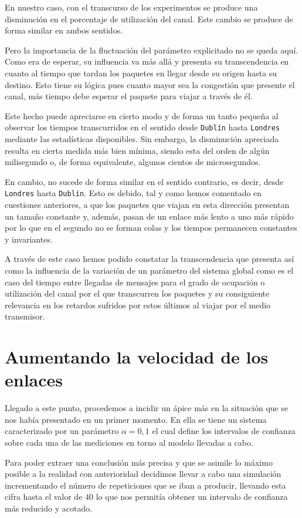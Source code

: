 \documentclass{article}[10pt]
\begin{document}
		En nuestro caso, con el transcurso de los experimentos se produce una disminución en el porcentaje de utilización del canal. Este cambio se produce de forma similar en ambos sentidos.

		Pero la importancia de la fluctuación del parámetro explicitado no se queda aquí. Como era de esperar, su influencia va más allá y presenta su transcendencia en cuanto al tiempo que tardan los paquetes en llegar desde su origen hasta su destino. Esto tiene su lógica pues cuanto mayor sea la congestión que presente el canal, más tiempo debe esperar el paquete para viajar a través de él.

		Este hecho puede apreciarse en cierto modo y de forma un tanto pequeña al observar los tiempos transcurridos en el sentido desde \texttt{Dublín} hasta \texttt{Londres} mediante las estadísticas disponibles. Sin embargo, la disminución apreciada resulta en cierta medida más bien mínima, siendo esta del orden de algún milisegundo o, de forma equivalente, algunos cientos de microsegundos.

		En cambio, no sucede de forma similar en el sentido contrario, es decir, desde \texttt{Londres} hasta \texttt{Dublín}. Esto es debido, tal y como hemos comentado en cuestiones anteriores, a que los paquetes que viajan en esta dirección presentan un tamaño constante y, además, pasan de un enlace más lento a uno más rápido por lo que en el segundo no se forman colas y los tiempos permanecen constantes y invariantes.

		A través de este caso hemos podido constatar la transcendencia que presenta así como la influencia de la variación de un parámetro del sistema global como es el caso del tiempo entre llegadas de mensajes para el grado de ocupación o utilización del canal por el que transcurren los paquetes y su consiguiente relevancia en los retardos sufridos por estos últimos al viajar por el medio transmisor.

	\section{Aumentando la velocidad de los enlaces}
		Llegado a este punto, procedemos a incidir un ápice más en la situación que se nos había presentado en un primer momento. En ella se tiene un sistema caracterizado por un parámetro $\alpha = 0,1$ el cual define los intervalos de confianza sobre cada una de las mediciones en torno al modelo llevadas a cabo.

		Para poder extraer una conclusión más precisa y que se asimile lo máximo posible a la realidad con anterioridad decidimos llevar a cabo una simulación incrementando el número de repeticiones que se iban a producir, llevando esta cifra hasta el valor de $40$ lo que nos permitía obtener un intervalo de confianza más reducido y acotado.
\end{document}
